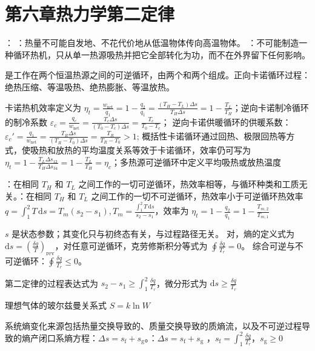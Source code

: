 \section{第六章\quad 热力学第二定律}


：
：热量不可能自发地、不花代价地从低温物体传向高温物体。
：不可能制造一种循环热机，只从单一热源吸热并把它全部转化为功，而不在外界留下任何影响。

\divider

是工作在两个恒温热源之间的可逆循环，由两个和两个组成。正向卡诺循环过程：绝热压缩、等温吸热、绝热膨胀、等温放热。

卡诺热机效率定义为 $\eta_t=\frac{w_{\mathrm{net}}}{q_1}=1-\frac{q_2}{q_1}=\frac{(T_H-T_L)\Delta s}{T_H\Delta s}=1-\frac{T_L}{T_H}$；逆向卡诺制冷循环的制冷系数 $\varepsilon_c=\frac{q_c}{w_{\mathrm{net}}}=\frac{T_c\Delta s}{(T_0-T_c)\Delta s}=\frac{T_c}{T_0-T_c}$； 逆向卡诺供暖循环的供暖系数：$\varepsilon_c'=\frac{q_1}{w_{\mathrm{net}}}=\frac{T_R\Delta s}{(T_R-T_0)\Delta s}=\frac{T_R}{T_R-T_0}>1$; 概括性卡诺循环通过回热、极限回热等方式，使吸热和放热的平均温度关系等效于卡诺循环，效率仍可写为 $\eta_t=1-\frac{T_L\Delta s_{12}}{T_H\Delta s_{34}}=1-\frac{T_L}{T_H}=\eta_c$；多热源可逆循环中定义平均吸热或放热温度

：在相同 $T_H$ 和 $T_L$ 之间工作的一切可逆循环，热效率相等，与循环种类和工质无关。：在相同 $T_H$ 和 $T_L$ 之间工作的一切不可逆循环，热效率小于可逆循环热效率 $q=\int_1^2T\,\mathrm{d}s=T_m(s_2-s_1),T_m=\frac{\int_1^2T\,\mathrm{d}s}{s_2-s_1}$，效率为 $\eta_t=1-\frac{q_2}{q_1}=1-\frac{T_{m,2}}{T_{m,1}}$

\divider

 $s$ 是状态参数；其变化只与初终态有关，与过程路径无关。
对，熵的定义式为 $\mathrm{d}s=\left(\frac{\delta q}{T}\right)_{\mathrm{rev}}$，对任意可逆循环，克劳修斯积分等式为 $\oint \frac{\delta q}{T_r}=0$。
综合可逆与不可逆循环：$\oint \frac{\delta q}{T_r}\leq 0$。

第二定律的过程表达式为 $s_2-s_1\geq \int_1^2\frac{\delta q}{T_r}$，微分形式为 $\mathrm{d}s\geq \frac{\delta q}{T_r}$

理想气体的玻尔兹曼关系式 $S=k\ln W$

\divider

系统熵变化来源包括热量交换导致的、质量交换导致的质熵流，以及不可逆过程导致的熵产闭口系熵方程：$\Delta s=s_{\mathrm{f}}+s_{\mathrm{g}}$。：$\Delta s=s_{\mathrm{f}}+s_{\mathrm{g}}$ ，$s_{\mathrm{f}}=\int_1^2\frac{\delta q}{T_r}$，$s_{\mathrm{g}}\geq 0$

